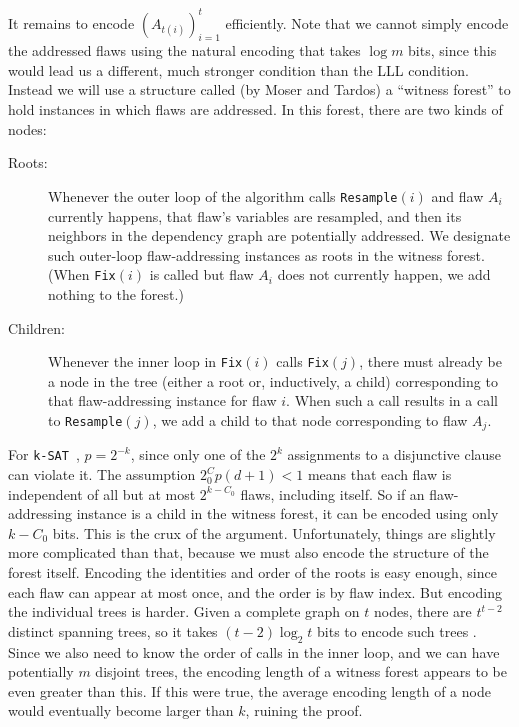 \documentclass{article}
\newcommand{\ksat}{\texttt{k-SAT}~}
\begin{document}
It remains to encode $(A_{t(i)})_{i=1}^{t}$ efficiently.  Note that we cannot simply encode the addressed flaws using the natural encoding that takes $\log m$ bits, since this would lead us a different, much stronger condition than the LLL condition.  Instead we will use a structure called (by Moser and Tardos) a ``witness forest'' to hold instances in which flaws are addressed.  In this forest, there are two kinds of nodes:
\begin{description}
  \item[Roots:] Whenever the outer loop of the algorithm calls \texttt{Resample}$(i)$ and flaw $A_i$ currently happens, that flaw's variables are resampled, and then its neighbors in the dependency graph are potentially addressed.  We designate such outer-loop flaw-addressing instances as roots in the witness forest.  (When \texttt{Fix}$(i)$ is called but flaw $A_i$ does not currently happen, we add nothing to the forest.)
  \item[Children:] Whenever the inner loop in \texttt{Fix}$(i)$ calls \texttt{Fix}$(j)$, there must already be a node in the tree (either a root or, inductively, a child) corresponding to that flaw-addressing instance for flaw $i$.  When such a call results in a call to \texttt{Resample}$(j)$, we add a child to that node corresponding to flaw $A_j$.
\end{description}

For \ksat, $p = 2^{-k}$, since only one of the $2^k$ assignments to a disjunctive clause can violate it.  The assumption $2^C_0 p (d+1) < 1$ means that each flaw is independent of all but at most $2^{k-C_0}$ flaws, including itself.  So if an flaw-addressing instance is a child in the witness forest, it can be encoded using only $k-C_0$ bits.  This is the crux of the argument.  Unfortunately, things are slightly more complicated than that, because we must also encode the structure of the forest itself.  Encoding the identities and order of the roots is easy enough, since each flaw can appear at most once, and the order is by flaw index.  But encoding the individual trees is harder.  Given a complete graph on $t$ nodes, there are $t^{t-2}$ distinct spanning trees, so it takes $(t-2) \log_2 t$ bits to encode such trees \cite{prufer1918neuer,neville1953codifying}.  Since we also need to know the order of calls in the inner loop, and we can have potentially $m$ disjoint trees, the encoding length of a witness forest appears to be even greater than this.  If this were true, the average encoding length of a node would eventually become larger than $k$, ruining the proof.
\end{document}
